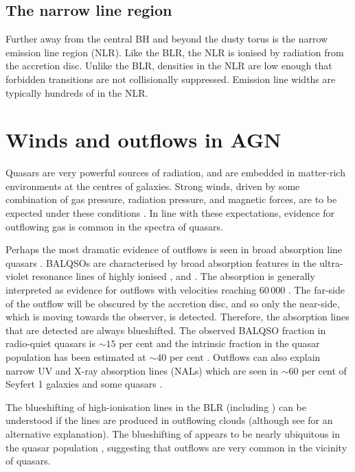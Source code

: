 \subsection{The narrow line region}

Further away from the central BH and beyond the dusty torus is the narrow emission line region (NLR). 
Like the BLR, the NLR is ionised by radiation from the accretion disc. 
Unlike the BLR, densities in the NLR are low enough that forbidden transitions are not collisionally suppressed. 
Emission line widths are typically hundreds of \kms in the NLR. 

\section{Winds and outflows in AGN}

Quasars are very powerful sources of radiation, and are embedded in matter-rich environments at the centres of galaxies.
Strong winds, driven by some combination of gas pressure, radiation pressure, and magnetic forces, are to be expected under these conditions \citep[e.g.][]{blandford82b,proga00,everett05}. 
In line with these expectations, evidence for outflowing gas is common in the spectra of quasars. 

Perhaps the most dramatic evidence of outflows is seen in broad absorption line quasars \citep[BALQSOs;][]{weymann91}.
BALQSOs are characterised by broad absorption features in the ultra-violet resonance lines of highly ionised ,  and . 
The absorption is generally interpreted as evidence for outflows with velocities reaching $60\,000$ \kms \citep[e.g.][]{turnshek88}.
The far-side of the outflow will be obscured by the accretion disc, and so only the near-side, which is moving towards the observer, is detected. 
Therefore, the absorption lines that are detected are always blueshifted. 
The observed  BALQSO fraction in radio-quiet quasars is $\sim15$ per cent \citep[e.g.][]{hewett03,reichard03} and the intrinsic fraction in the quasar population has been estimated at $\sim40$ per cent \citep{allen11}.
Outflows can also explain narrow UV and X-ray absorption lines (NALs) which are seen in $\sim60$ per cent of Seyfert 1 galaxies \citep{crenshaw99}  and some quasars \citep[e.g.][]{hamann97}. 

The blueshifting of high-ionisation lines in the BLR (including ) can be understood if the lines are produced in outflowing clouds (although see \citealt{gaskell16} for an alternative explanation). 
The blueshifting of  appears to be nearly ubiquitous in the quasar population \citep[e.g.][]{richards02,richards11}, suggesting that outflows are very common in the vicinity of quasars. 

